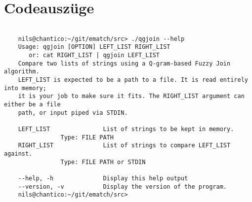 \section{Codeauszüge}



\clearpage




\begin{lstlisting}[style=xterm, caption=Ausgabe der Endnutzerdokumentation über den --help parameter, label=fig:cliHelp,]

	nils@chantico:~/git/ematch/src> ./qgjoin --help
	Usage: qgjoin [OPTION] LEFT_LIST RIGHT_LIST
	   or: cat RIGHT_LIST | qgjoin LEFT_LIST
	Compare two lists of strings using a Q-gram-based Fuzzy Join algorithm.
	LEFT_LIST is expected to be a path to a file. It is read entirely into memory;
	it is your job to make sure it fits. The RIGHT_LIST argument can either be a file
	path, or input piped via STDIN.
	
	LEFT_LIST               List of strings to be kept in memory.
				Type: FILE PATH
	RIGHT_LIST              List of strings to compare LEFT_LIST against.
				Type: FILE PATH or STDIN
	
	--help, -h              Display this help output
	--version, -v           Display the version of the program.
	nils@chantico:~/git/ematch/src>

\end{lstlisting}


